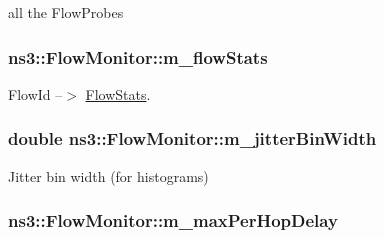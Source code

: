 all the Flow\+Probes 

\subsubsection[{\texorpdfstring{m\+\_\+flow\+Stats}{m_flowStats}}]{ ns3\+::\+Flow\+Monitor\+::m\+\_\+flow\+Stats\hspace{0.3cm}{\ttfamily [private]}}\hypertarget{classns3_1_1FlowMonitor_a2699e372608a07801e1d1028377d08da}{}\label{classns3_1_1FlowMonitor_a2699e372608a07801e1d1028377d08da}


Flow\+Id --$>$ \hyperlink{structns3_1_1FlowMonitor_1_1FlowStats}{Flow\+Stats}. 

\subsubsection[{\texorpdfstring{m\+\_\+jitter\+Bin\+Width}{m_jitterBinWidth}}]{\setlength{\rightskip}{0pt plus 5cm}double ns3\+::\+Flow\+Monitor\+::m\+\_\+jitter\+Bin\+Width\hspace{0.3cm}{\ttfamily [private]}}\hypertarget{classns3_1_1FlowMonitor_a77909688b3900c5a60059f414900d23d}{}\label{classns3_1_1FlowMonitor_a77909688b3900c5a60059f414900d23d}


Jitter bin width (for histograms) 

\subsubsection[{\texorpdfstring{m\+\_\+max\+Per\+Hop\+Delay}{m_maxPerHopDelay}}]{ ns3\+::\+Flow\+Monitor\+::m\+\_\+max\+Per\+Hop\+Delay\hspace{0.3cm}{\ttfamily [private]}}\hypertarget{classns3_1_1FlowMonitor_a9f05e6d42213432dc8a6f79510b38b6c}{}\label{classns3_1_1FlowMonitor_a9f05e6d42213432dc8a6f79510b38b6c}


